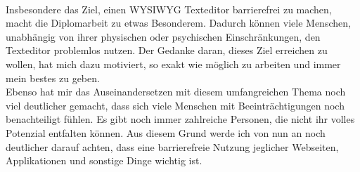 \mbox{}\\
Insbesondere das Ziel, einen WYSIWYG Texteditor barrierefrei zu machen, macht die Diplomarbeit zu etwas Besonderem. Dadurch können viele Menschen, unabhängig von ihrer physischen oder psychischen Einschränkungen, den Texteditor problemlos nutzen. Der Gedanke daran, dieses Ziel erreichen zu wollen, hat mich dazu motiviert, so exakt wie möglich zu arbeiten und immer mein bestes zu geben.\\
Ebenso hat mir das Auseinandersetzen mit diesem umfangreichen Thema noch viel deutlicher gemacht, dass sich viele Menschen mit Beeinträchtigungen noch benachteiligt fühlen. Es gibt noch immer zahlreiche Personen, die nicht ihr volles Potenzial entfalten können. Aus diesem Grund werde ich von nun an noch deutlicher darauf achten, dass eine barrierefreie Nutzung jeglicher Webseiten, Applikationen und sonstige Dinge wichtig ist.